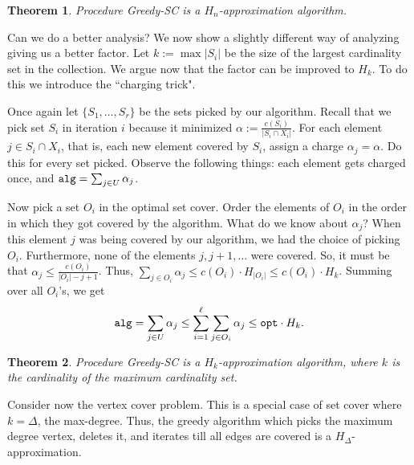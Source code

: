 \documentclass[11pt]{article}
\newtheorem{theorem}{Theorem}
\def\opt{{\tt opt}}
\def\alg{{\tt alg}}
\begin{document}
\begin{theorem}
Procedure {\sc Greedy-SC} is a $H_n$-approximation algorithm.
\end{theorem}

Can we do a better analysis? We now show a slightly different way of analyzing giving us a better factor.
Let $k := \max |S_i|$ be the size of the largest cardinality set in the collection. We argue now that the factor can be improved to $H_k$. To do this we introduce the ``charging trick".

Once again let $\{S_1,\ldots,S_r\}$ be the sets picked by our algorithm. Recall that we pick set $S_i$ in iteration $i$ because it minimized $\alpha := \frac{c(S_i)}{|S_i\cap X_i|}$. For each element $j \in S_i\cap X_i$, that is, each new element covered by $S_i$, assign a charge $\alpha_j = \alpha$. Do this for every set picked. Observe the following things: each element gets charged once, and $\alg = \sum_{j\in U} \alpha_j$.

Now pick a set $O_i$ in the optimal set cover. Order the elements of $O_i$ in the order in which they got covered by the algorithm.
What do we know about $\alpha_j$?
When this element $j$ was being covered by our algorithm, we had the choice of picking $O_i$. Furthermore, 
none of the elements $j,j+1,\ldots$ were covered. So, it must be that $\alpha_j \le \frac{c(O_i)}{|O_i|-j+1}$.
Thus, $\sum_{j\in O_i}\alpha_j \le c(O_i)\cdot H_{|O_i|} \le c(O_i)\cdot H_k$. Summing over all $O_i$'s, we get
$$\alg = \sum_{j\in U} \alpha_j \le \sum_{i=1}^\ell \sum_{j\in O_i} \alpha_j\le  \opt\cdot H_k.$$

\begin{theorem}
Procedure {\sc Greedy-SC} is a $H_k$-approximation algorithm, where $k$ is the cardinality 
of the maximum cardinality set. 
\end{theorem}

Consider now the vertex cover problem. This is a special case of set cover where $k=\Delta$, the max-degree.
Thus, the greedy algorithm which picks the maximum degree vertex, deletes it, and iterates till all edges are covered is a $H_\Delta$-approximation. 
\end{document}

